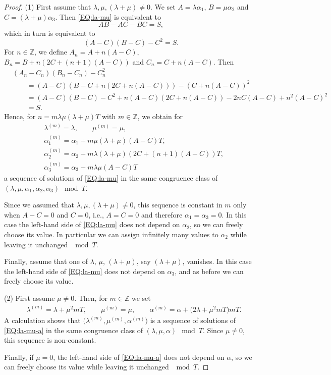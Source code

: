 \documentclass[pdftex]{sigma}
\numberwithin{equation}{section}
\theoremstyle{definition}
\numberwithin{table}{section}
\newcommand{\Z}{\mathbb{Z}}
\begin{document}
\begin{proof}
		(1) First assume that $\lambda,\mu,(\lambda+\mu)\neq 0$. We set $A=\lambda\alpha_1$, $B=\mu\alpha_2$ and $C=(\lambda+\mu)\alpha_3$. Then \eqref{EQ:la-mu} is equivalent to
		\[ AB-AC-BC=S, \]
		which in turn is equivalent to
		\[ (A-C)(B-C)-C^2=S. \]
		For $n\in\Z$, we define $A_n=A+n(A-C)$, $B_n=B+n(2C+(n+1)(A-C))$ and $C_n=C+n(A-C)$. Then
		\begin{align*}
			 &(A_n-C_n)(B_n-C_n)-C_n^2\\
&\qquad =(A-C)(B-C+n(2C+n(A-C))) - (C+n(A-C))^2\\
&\qquad			= (A-C)(B-C)-C^2+n(A-C)(2C+n(A-C)) - 2nC(A-C)+n^2(A-C)^2\\		
&\qquad				= S.
		\end{align*}
		Hence, for $n=m\lambda\mu(\lambda+\mu)T$ with $m\in\Z$, we obtain for
		\begin{align*}
			&\lambda^{(m)}=\lambda,\qquad \mu^{(m)}=\mu,\\
			&\alpha_1^{(m)}=\alpha_1+m\mu(\lambda+\mu)(A-C)T,\\
			&\alpha_2^{(m)}=\alpha_2+m\lambda(\lambda+\mu)(2C+(n+1)(A-C))T,\\
			&\alpha_3^{(m)}=\alpha_3+m\lambda\mu(A-C)T
		\end{align*}
		a sequence of solutions of \eqref{EQ:la-mu} in the same congruence class of $(\lambda,\mu,\alpha_1,\alpha_2,\alpha_3)\mod T$.
		
		Since we assumed that $\lambda,\mu,(\lambda+\mu)\neq 0$, this sequence is constant in $m$ only when $A-C=0$ and $C=0$, i.e., $A=C=0$ and therefore $\alpha_1=\alpha_3=0$. In this case the left-hand side of \eqref{EQ:la-mu} does not depend on $\alpha_2$, so we can freely choose its value. In particular we can assign infinitely many values to $\alpha_2$ while leaving it unchanged $\mod T$.
		
		Finally, assume that one of $\lambda$, $\mu$, $(\lambda+\mu)$, say $(\lambda+\mu)$, vanishes. In this case the left-hand side of \eqref{EQ:la-mu} does not depend on $\alpha_3$, and as before we can freely choose its value.
		
        (2) First assume $\mu\neq0$. Then, for $m\in\Z$ we set
		\begin{align*}
			&\lambda^{(m)}=\lambda+\mu^2m T,\qquad
            \mu^{(m)}=\mu,\qquad
			\alpha^{(m)}=\alpha+\bigl(2\lambda+\mu^2mT\bigr)mT.
		\end{align*}
		A calculation shows that $\bigl(\lambda^{(m)},\mu^{(m)},\alpha^{(m)}\bigr)$ is a sequence of solutions of \eqref{EQ:la-mu-a} in the same congruence class of $(\lambda,\mu,\alpha)\mod T$. Since $\mu\neq 0$, this sequence is non-constant.
		
		Finally, if $\mu=0$, the left-hand side of \eqref{EQ:la-mu-a} does not depend on $\alpha$, so we can freely choose its value while leaving it unchanged $\mod T$.
\end{proof}
\end{document}
